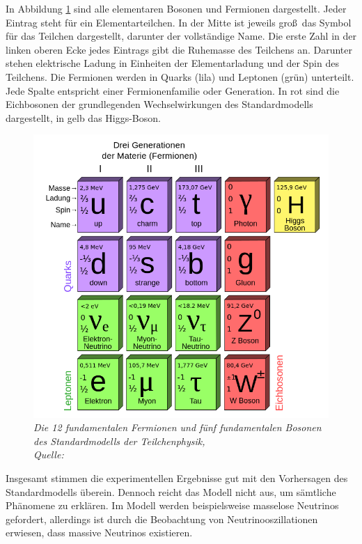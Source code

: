 In Abbildung \ref{fig:Standardmodell} sind alle elementaren Bosonen und Fermionen dargestellt. Jeder Eintrag steht f\"ur ein Elementarteilchen. In der Mitte ist jeweils gro\ss~das Symbol f\"ur das Teilchen dargestellt, darunter der vollst\"andige Name. Die erste Zahl in der linken oberen Ecke jedes Eintrags gibt die Ruhemasse des Teilchens an. Darunter stehen elektrische Ladung in Einheiten der Elementarladung und der Spin des Teilchens. Die Fermionen werden in Quarks (lila) und Leptonen (gr\"un) unterteilt. Jede Spalte entspricht einer Fermionenfamilie oder Generation. In rot sind die Eichbosonen der grundlegenden Wechselwirkungen des Standardmodells dargestellt, in gelb das Higgs-Boson.

\begin{figure}[hhh]
 \begin{center}
   \includegraphics[width=\textwidth]{graphics/Standard_Model.png}
   \parbox[b]{12cm}{
     \caption[Standardmodell der Teilchenphysik]
             {\label{fig:Standardmodell}\it Die 12 fundamentalen Fermionen und f\"unf fundamentalen Bosonen des Standardmodells der Teilchenphysik,\\ Quelle: \cite{wiki:Standardmodell}}
   }
 \end{center}
\end{figure}

Insgesamt stimmen die experimentellen Ergebnisse gut mit den Vorhersagen des Standardmodells \"uberein. Dennoch reicht das Modell nicht aus, um s\"amtliche Ph\"anomene zu erkl\"aren. Im Modell werden beispielsweise masselose Neutrinos gefordert, allerdings ist durch die Beobachtung von Neutrinooszillationen erwiesen, dass massive Neutrinos existieren.

